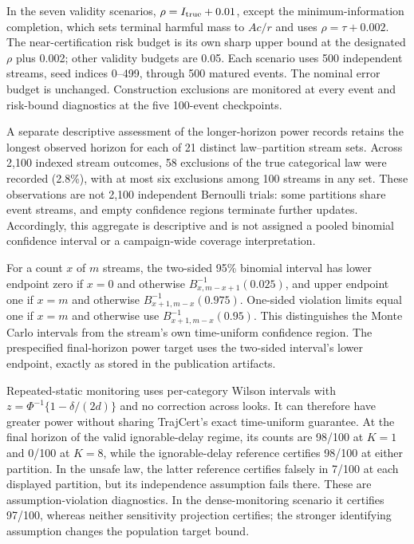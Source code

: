 \documentclass[10pt]{article}
\begin{document}
In the seven validity scenarios, $\rho=I_{\rm true}+0.01$, except the minimum-information completion, which sets terminal harmful mass to $Ac/r$ and uses $\rho=\tau+0.002$. The near-certification risk budget is its own sharp upper bound at the designated $\rho$ plus 0.002; other validity budgets are 0.05. Each scenario uses 500 independent streams, seed indices 0--499, through 500 matured events. The nominal error budget is unchanged. Construction exclusions are monitored at every event and risk-bound diagnostics at the five 100-event checkpoints.

A separate descriptive assessment of the longer-horizon power records retains the longest observed horizon for each of 21 distinct law--partition stream sets. Across 2,100 indexed stream outcomes, 58 exclusions of the true categorical law were recorded (2.8\%), with at most six exclusions among 100 streams in any set. These observations are not 2,100 independent Bernoulli trials: some partitions share event streams, and empty confidence regions terminate further updates. Accordingly, this aggregate is descriptive and is not assigned a pooled binomial confidence interval or a campaign-wide coverage interpretation.

For a count $x$ of $m$ streams, the two-sided 95\% binomial interval has lower endpoint zero if $x=0$ and otherwise $B^{-1}_{x,m-x+1}(0.025)$, and upper endpoint one if $x=m$ and otherwise $B^{-1}_{x+1,m-x}(0.975)$. One-sided violation limits equal one if $x=m$ and otherwise use $B^{-1}_{x+1,m-x}(0.95)$. This distinguishes the Monte Carlo intervals from the stream's own time-uniform confidence region. The prespecified final-horizon power target uses the two-sided interval's lower endpoint, exactly as stored in the publication artifacts.

Repeated-static monitoring uses per-category Wilson intervals with $z=\Phi^{-1}\{1-\delta/(2d)\}$ and no correction across looks. It can therefore have greater power without sharing TrajCert's exact time-uniform guarantee. At the final horizon of the valid ignorable-delay regime, its counts are 98/100 at $K=1$ and 0/100 at $K=8$, while the ignorable-delay reference certifies 98/100 at either partition. In the unsafe law, the latter reference certifies falsely in 7/100 at each displayed partition, but its independence assumption fails there. These are assumption-violation diagnostics. In the dense-monitoring scenario it certifies 97/100, whereas neither sensitivity projection certifies; the stronger identifying assumption changes the population target bound.
\end{document}
